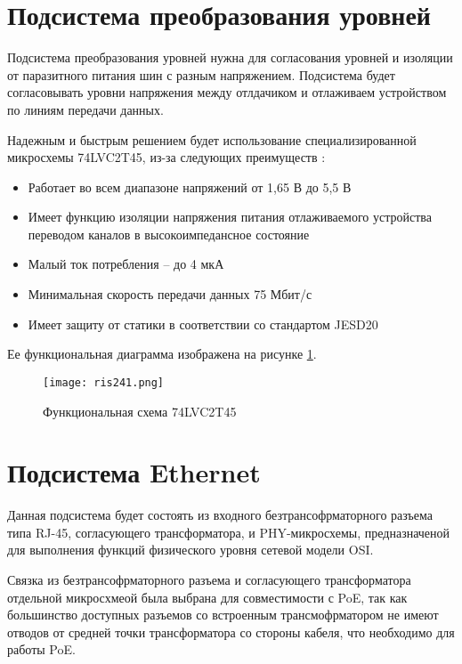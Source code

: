 \section{Подсистема преобразования уровней}
\hspace{1cm}

Подсистема преобразования уровней нужна для согласования уровней и изоляции от паразитного 
питания шин с разным напряжением. Подсистема будет согласовывать уровни напряжения между
отлдачиком и отлаживаем устройством по линиям передачи данных. 

Надежным и быстрым решением будет использование специализированной микросхемы 74LVC2T45, из-за
следующих преимуществ \cite{SN74LVC2T45:datasheet}:
\begin{itemize}
  \item Работает во всем диапазоне напряжений от 1,65 В до 5,5 В
  \item Имеет функцию изоляции напряжения питания отлаживаемого устройства переводом каналов в
  высокоимпедансное состояние
  \item Малый ток потребления -- до 4 мкА
  \item Минимальная скорость передачи данных 75 Мбит/с
  \item Имеет защиту от статики в соответствии со стандартом JESD20
\end{itemize}
 Ее функциональная диаграмма изображена на рисунке \ref{ris:241}.

\begin{figure}[H]
  \centering
  \texttt{[image: ris241.png]}
  \caption{Функциональная схема 74LVC2T45}
  \label{ris:241}
\end{figure}


\section{Подсистема Ethernet}
\hspace{1cm}

Данная подсистема будет состоять из входного безтрансофрматорного разъема типа RJ-45, 
согласующего трансформатора, и PHY-микросхемы, предназначеной для выполнения функций 
физического уровня сетевой модели OSI.

Связка из безтрансофрматорного разъема и согласующего трансформатора отдельной
микросхмеой была выбрана для совместимости с PoE, так как большинство доступных разъемов со 
встроенным трансмофрматором не имеют отводов от средней точки трансформатора со стороны кабеля,
что необходимо для работы PoE. 

